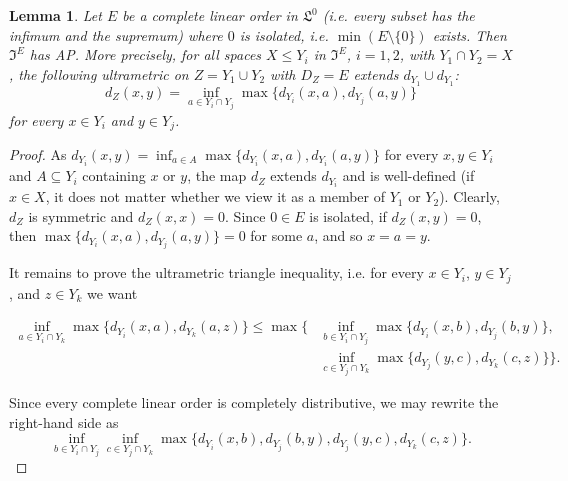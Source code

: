 \documentclass[oneside,notitlepage,12pt]{article}
\newtheorem{lm}[tw]{Lemma}
\theoremstyle{definition}
\theoremstyle{remark}
\newcommand \set [1]{\{#1\}}
\newcommand \Lin {\mathfrak{L}}
\newcommand \UltIso {\mathfrak{I}}
\begin{document}
\begin{lm} \label{thm:complete_isometric_amalgamation}
    Let $E$ be a complete linear order in $\Lin^0$ (i.e. every subset has the infimum and the supremum) where $0$ is isolated, i.e. $\min(E \setminus \set{0})$ exists.
    Then $\UltIso^E$ has AP.
    More precisely, for all spaces $X \leq Y_i$ in $\UltIso^E$, $i = 1, 2$, with $Y_1 \cap Y_2 = X$, the following ultrametric on $Z = Y_1 \cup Y_2$ with $D_Z = E$ extends $d_{Y_1} \cup d_{Y_1}$:
    \[
        d_Z(x, y) = \inf_{a \in Y_i \cap Y_j} \max\set{d_{Y_i}(x, a), d_{Y_j}(a, y)}
    \]
    for every $x \in Y_i$ and $y \in Y_j$.
\end{lm}
\begin{proof}
    As $d_{Y_i}(x, y) = \inf_{a \in A} \max\set{d_{Y_i}(x, a), d_{Y_i}(a, y)}$ for every $x, y \in Y_i$ and $A \subseteq Y_i$ containing $x$ or $y$, the map $d_Z$ extends $d_{Y_i}$ and is well-defined (if $x \in X$, it does not matter whether we view it as a member of $Y_1$ or $Y_2$).
    Clearly, $d_Z$ is symmetric and $d_Z(x, x) = 0$.
    Since $0 \in E$ is isolated, if $d_Z(x, y) = 0$, then $\max\set{d_{Y_i}(x, a), d_{Y_j}(a, y)} = 0$ for some $a$, and so $x = a = y$.
    
    It remains to prove the ultrametric triangle inequality, i.e. for every $x \in Y_i$, $y \in Y_j$, and $z \in Y_k$ we want
 
    \begin{align*}
        \inf_{a \in Y_i \cap Y_k} \max\set{d_{Y_i}(x, a), d_{Y_k}(a, z)}
        \leq
        \max\bigl\{&\inf_{b \in Y_i \cap Y_j} \max\set{d_{Y_i}(x, b), d_{Y_j}(b, y)} 
        ,\\
        &\inf_{c \in Y_j \cap Y_k} \max\set{d_{Y_j}(y, c), d_{Y_k}(c, z)}\bigr\}.
    \end{align*}
    
    Since every complete linear order is completely distributive, we may rewrite the right-hand side as 
      \[
        \inf_{b \in Y_i \cap Y_j} \inf_{c \in Y_j \cap Y_k} \max\{d_{Y_i}(x, b) , d_{Y_j}(b, y) , d_{Y_j}(y, c) , d_{Y_k}(c, z)\}.
    \]
    

\end{proof}
\end{document}
